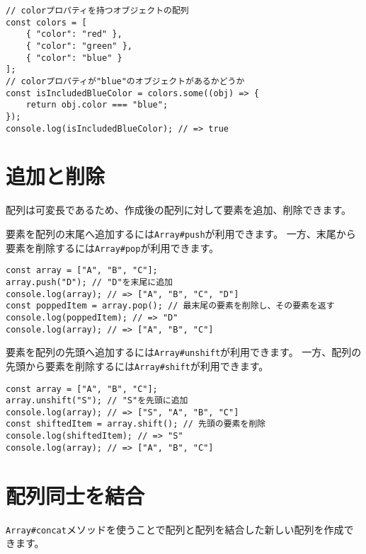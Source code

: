 \begin{lstlisting}
// colorプロパティを持つオブジェクトの配列
const colors = [
    { "color": "red" },
    { "color": "green" },
    { "color": "blue" }
];
// colorプロパティが"blue"のオブジェクトがあるかどうか
const isIncludedBlueColor = colors.some((obj) => {
    return obj.color === "blue";
});
console.log(isIncludedBlueColor); // => true
\end{lstlisting}

\hypertarget{add-and-delete}{%
\section{追加と削除}\label{add-and-delete}}

配列は可変長であるため、作成後の配列に対して要素を追加、削除できます。

要素を配列の末尾へ追加するには\texttt{Array\#push}が利用できます。
一方、末尾から要素を削除するには\texttt{Array\#pop}が利用できます。

\begin{lstlisting}
const array = ["A", "B", "C"];
array.push("D"); // "D"を末尾に追加
console.log(array); // => ["A", "B", "C", "D"]
const poppedItem = array.pop(); // 最末尾の要素を削除し、その要素を返す 
console.log(poppedItem); // => "D"
console.log(array); // => ["A", "B", "C"]
\end{lstlisting}

要素を配列の先頭へ追加するには\texttt{Array\#unshift}が利用できます。
一方、配列の先頭から要素を削除するには\texttt{Array\#shift}が利用できます。

\begin{lstlisting}
const array = ["A", "B", "C"];
array.unshift("S"); // "S"を先頭に追加
console.log(array); // => ["S", "A", "B", "C"]
const shiftedItem = array.shift(); // 先頭の要素を削除 
console.log(shiftedItem); // => "S"
console.log(array); // => ["A", "B", "C"]
\end{lstlisting}

\hypertarget{concat}{%
\section{配列同士を結合}\label{concat}}

\texttt{Array\#concat}メソッドを使うことで配列と配列を結合した新しい配列を作成できます。

